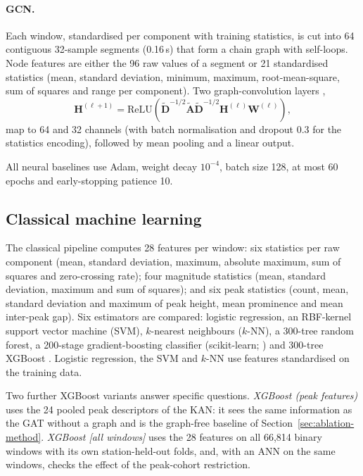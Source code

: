 \documentclass[a4paper,fleqn]{cas-dc}
\begin{document}
\paragraph{GCN.} Each window, standardised per component with training statistics, is cut
into 64 contiguous 32-sample segments (0.16\,s) that form a chain graph with self-loops.
Node features are either the 96 raw values of a segment or 21 standardised statistics
(mean, standard deviation, minimum, maximum, root-mean-square, sum of squares and range
per component). Two graph-convolution layers \citep{kipf2017},
\begin{equation}
\mathbf{H}^{(\ell+1)}=\mathrm{ReLU}\!\left(
\tilde{\mathbf{D}}^{-1/2}\tilde{\mathbf{A}}\tilde{\mathbf{D}}^{-1/2}
\mathbf{H}^{(\ell)}\mathbf{W}^{(\ell)}\right),
\end{equation}
map to 64 and 32 channels (with batch normalisation and dropout 0.3 for the statistics
encoding), followed by mean pooling and a linear output.

All neural baselines use Adam, weight decay $10^{-4}$, batch size 128, at most 60 epochs
and early-stopping patience 10.

\subsection{Classical machine learning}\label{sec:ml}
The classical pipeline computes 28 features per window: six statistics per raw
component (mean, standard deviation, maximum, absolute maximum, sum of squares and
zero-crossing rate); four magnitude statistics (mean, standard deviation, maximum and
sum of squares); and six peak statistics (count, mean, standard deviation and maximum of
peak height, mean prominence and mean inter-peak gap). Six estimators are compared:
logistic regression, an RBF-kernel support vector machine (SVM), $k$-nearest neighbours
($k$-NN), a 300-tree random forest, a 200-stage gradient-boosting classifier
(scikit-learn; \citealp{pedregosa2011}) and 300-tree XGBoost \citep{chen2016xgboost}.
Logistic regression, the SVM and $k$-NN use features standardised on the training data.

Two further XGBoost variants answer specific questions. \emph{XGBoost (peak features)}
uses the 24 pooled peak descriptors of the KAN: it sees the same information as the GAT
without a graph and is the graph-free baseline of Section~\ref{sec:ablation-method}.
\emph{XGBoost [all windows]} uses the 28 features on all 66,814 binary windows with its
own station-held-out folds, and, with an ANN on the same windows, checks the effect of the
peak-cohort restriction.
\end{document}
